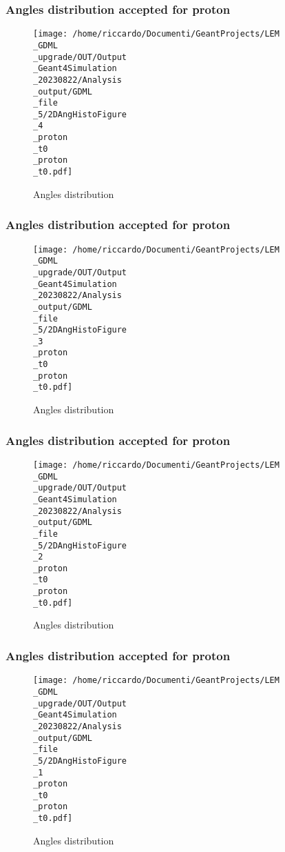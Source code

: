 \documentclass[8pt]{beamer}
\begin{document}
            \begin{frame}
                \frametitle{Angles distribution accepted for proton}
            
        \begin{figure}[h]
            \centering
            \texttt{[image: /home/riccardo/Documenti/GeantProjects/LEM\\\_GDML\\\_upgrade/OUT/Output\\\_Geant4Simulation\\\_20230822/Analysis\\\_output/GDML\\\_file\\\_5/2DAngHistoFigure\\\_4\\\_proton\\\_t0\\\_proton\\\_t0.pdf]}
            \caption{Angles distribution}
        \end{figure}
        
            \end{frame}
            
            \begin{frame}
                \frametitle{Angles distribution accepted for proton}
            
        \begin{figure}[h]
            \centering
            \texttt{[image: /home/riccardo/Documenti/GeantProjects/LEM\\\_GDML\\\_upgrade/OUT/Output\\\_Geant4Simulation\\\_20230822/Analysis\\\_output/GDML\\\_file\\\_5/2DAngHistoFigure\\\_3\\\_proton\\\_t0\\\_proton\\\_t0.pdf]}
            \caption{Angles distribution}
        \end{figure}
        
            \end{frame}
            
            \begin{frame}
                \frametitle{Angles distribution accepted for proton}
            
        \begin{figure}[h]
            \centering
            \texttt{[image: /home/riccardo/Documenti/GeantProjects/LEM\\\_GDML\\\_upgrade/OUT/Output\\\_Geant4Simulation\\\_20230822/Analysis\\\_output/GDML\\\_file\\\_5/2DAngHistoFigure\\\_2\\\_proton\\\_t0\\\_proton\\\_t0.pdf]}
            \caption{Angles distribution}
        \end{figure}
        
            \end{frame}
            
            \begin{frame}
                \frametitle{Angles distribution accepted for proton}
            
        \begin{figure}[h]
            \centering
            \texttt{[image: /home/riccardo/Documenti/GeantProjects/LEM\\\_GDML\\\_upgrade/OUT/Output\\\_Geant4Simulation\\\_20230822/Analysis\\\_output/GDML\\\_file\\\_5/2DAngHistoFigure\\\_1\\\_proton\\\_t0\\\_proton\\\_t0.pdf]}
            \caption{Angles distribution}
        \end{figure}
        
            \end{frame}
            
\end{document}
